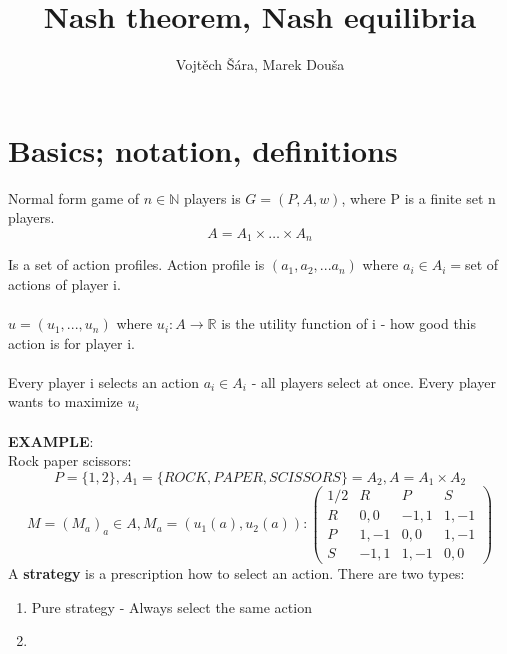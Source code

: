 \documentclass{article}
\title{Nash theorem, Nash equilibria}
\author{Vojtěch Šára, Marek Douša}
\begin{document}
\maketitle
\section{Basics; notation, definitions}
Normal form game of $n \in \mathbb{N}$ players is $G = (P,A,w)$, where P is a finite set n players.
$$A = A_{1}\times \dots \times A_{n}$$

Is a set of action profiles. Action profile is $(a_{1},a_{2},...a_{n})$ where $a_{i} \in A_{i} = $set of actions of player i.\\\\

$u = (u_{1},...,u_{n})$ where $u_{i} : A \rightarrow \mathbb{R}$ is the utility function of i - how good this action is for player i.\\\\

Every player i selects an action $a_{i} \in A_{i}$ - all players select at once. Every player wants to maximize $u_{i}$\\\\

\textbf{EXAMPLE}:\\
Rock paper scissors:
$$P = \{1,2\}, A_{1} = \{ROCK, PAPER, SCISSORS\} = A_{2}, A = A_{1} \times A_{2}$$
$$
M = (M_{a})_{a} \in A, M_{a} = (u_{1}(a),u_{2}(a)) : \begin{pmatrix}
    1/2 & R & P & S\\
    R & 0,0 & -1,1 & 1,-1\\
    P & 1,-1 & 0,0 & 1,-1\\
    S & -1,1 & 1,-1 & 0,0 
\end{pmatrix}
$$
A \textbf{strategy} is a prescription how to select an action. There are two types:
\begin{enumerate}
    \item Pure strategy - Always select the same action
    \item 
\end{enumerate}
\end{document}
